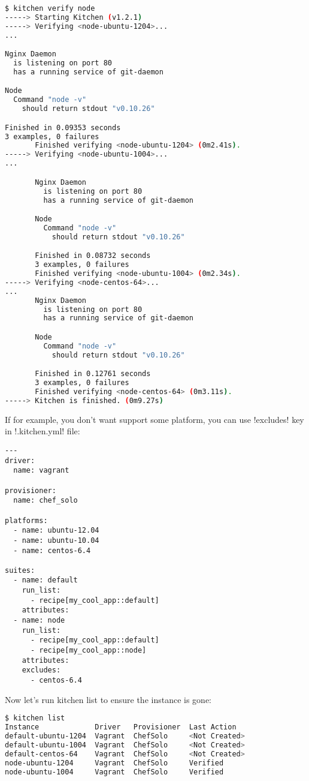 \begin{lstlisting}[language=Bash,label=lst:testing-test-kitchen42]
$ kitchen verify node
-----> Starting Kitchen (v1.2.1)
-----> Verifying <node-ubuntu-1204>...
...

Nginx Daemon
  is listening on port 80
  has a running service of git-daemon

Node
  Command "node -v"
    should return stdout "v0.10.26"

Finished in 0.09353 seconds
3 examples, 0 failures
       Finished verifying <node-ubuntu-1204> (0m2.41s).
-----> Verifying <node-ubuntu-1004>...
...

       Nginx Daemon
         is listening on port 80
         has a running service of git-daemon

       Node
         Command "node -v"
           should return stdout "v0.10.26"

       Finished in 0.08732 seconds
       3 examples, 0 failures
       Finished verifying <node-ubuntu-1004> (0m2.34s).
-----> Verifying <node-centos-64>...
...
       Nginx Daemon
         is listening on port 80
         has a running service of git-daemon

       Node
         Command "node -v"
           should return stdout "v0.10.26"

       Finished in 0.12761 seconds
       3 examples, 0 failures
       Finished verifying <node-centos-64> (0m3.11s).
-----> Kitchen is finished. (0m9.27s)
\end{lstlisting}

If for example, you don't want support some platform, you can use \inline!excludes! key in \inline!.kitchen.yml! file:

\begin{lstlisting}[label=lst:testing-test-kitchen43]
---
driver:
  name: vagrant

provisioner:
  name: chef_solo

platforms:
  - name: ubuntu-12.04
  - name: ubuntu-10.04
  - name: centos-6.4

suites:
  - name: default
    run_list:
      - recipe[my_cool_app::default]
    attributes:
  - name: node
    run_list:
      - recipe[my_cool_app::default]
      - recipe[my_cool_app::node]
    attributes:
    excludes:
      - centos-6.4
\end{lstlisting}

Now let's run kitchen list to ensure the instance is gone:

\begin{lstlisting}[language=Bash,label=lst:testing-test-kitchen44]
$ kitchen list
Instance             Driver   Provisioner  Last Action
default-ubuntu-1204  Vagrant  ChefSolo     <Not Created>
default-ubuntu-1004  Vagrant  ChefSolo     <Not Created>
default-centos-64    Vagrant  ChefSolo     <Not Created>
node-ubuntu-1204     Vagrant  ChefSolo     Verified
node-ubuntu-1004     Vagrant  ChefSolo     Verified
\end{lstlisting}